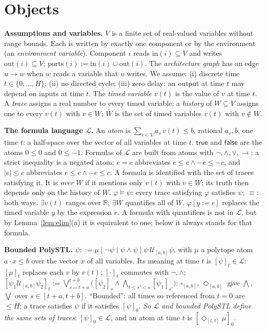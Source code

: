 \documentclass[10pt]{article}
\theoremstyle{tplain}\newtheorem{theorem}{Theorem}\newtheorem{lemma}[theorem]{Lemma}\newtheorem{proposition}[theorem]{Proposition}\newtheorem{corollary}[theorem]{Corollary}
\theoremstyle{tdef}\newtheorem{definition}[theorem]{Definition}
\newcommand{\inp}{\mathrm{in}}\newcommand{\outp}{\mathrm{out}}\newcommand{\ports}{\mathrm{ports}}
\newcommand{\TRUE}{\mathsf{true}}\newcommand{\FALSE}{\mathsf{false}}
\newcommand{\hid}[1]{\overline{#1}}
\begin{document}
\section{Objects}\label{sec:obj}
\textbf{Assumptions and variables.} $V$ is a finite set of real-valued variables without range bounds. Each is written by exactly one component or by the environment (an \emph{environment variable}). Component $i$ reads $\inp(i)\subseteq V$ and writes $\outp(i)\subseteq V$; $\ports(i):=\inp(i)\cup\outp(i)$. The \emph{architecture graph} has an edge $u\to w$ when $w$ reads a variable that $u$ writes. We assume: (i) discrete time $t\in\{0,\dots,H\}$; (ii) no directed cycle; (iii) zero delay: an output at time $t$ may depend on inputs at time $t$. The \emph{timed variable} $v(t)$ is the value of $v$ at time $t$. A \emph{trace} assigns a real number to every timed variable; a \emph{history} of $W\subseteq V$ assigns one to every $v(t)$ with $v\in W$; $\hid W$ is the set of timed variables $v(t)$ with $v\notin W$.

\textbf{The formula language $\mathcal L$.} An \emph{atom} is $\sum_{v\in V}a_v\,v(t)\le b$, rational $a_v,b$, one time $t$: a half-space over the vector of all variables at time $t$. $\TRUE$ and $\FALSE$ are the atoms $0\le0$ and $0\le-1$. Formulas of $\mathcal L$ are built from atoms with $\neg,\wedge,\vee,\to$; a strict inequality is a negated atom; $e=c$ abbreviates $e\le c\wedge -e\le -c$, and $|e|\le c$ abbreviates $e\le c\wedge -e\le c$. A formula is identified with the set of traces satisfying it. It is \emph{over} $W$ if it mentions only $v(t)$ with $v\in W$; its truth then depends only on the history of $W$. $\varphi\models\psi$: every trace satisfying $\varphi$ satisfies $\psi$; $\equiv$: both ways. $\exists v(t)$ ranges over $\mathbb R$; $\exists\hid W$ quantifies all of $\hid W$. $\varphi[y:=e]$ replaces the timed variable $y$ by the expression $e$. A formula with quantifiers is not in $\mathcal L$, but by Lemma~\ref{lem:elim}(a) it is equivalent to one; below it always stands for that formula.

\textbf{Bounded PolySTL.} $\psi::=\mu\mid\neg\psi\mid\psi\wedge\psi\mid\psi\,\mathcal U_{[a,b]}\psi$, with $\mu$ a polytope atom $a\cdot x\le b$ over the vector $x$ of all variables. Its meaning at time $t$ is $[\psi]_t\in\mathcal L$: $[\mu]_t$ replaces each $v$ by $v(t)$; $[\cdot]_t$ commutes with $\neg,\wedge$; $[\psi_1\mathcal U_{[a,b]}\psi_2]_t:=\bigvee_{s=t+a}^{t+b}\big([\psi_2]_s\wedge\bigwedge_{t\le s'<s}[\psi_1]_{s'}\big)$; $\square_{[a,b]}$, $\Diamond_{[a,b]}$ give $\bigwedge$, $\bigvee$ over $s\in[t+a,t+b]$. ``Bounded'': all times so referenced from $t=0$ are $\le H$; a trace satisfies $\psi$ if it satisfies $[\psi]_0$. \emph{So $\mathcal L$ and bounded PolySTL define the same sets of traces}: $[\psi]_0\in\mathcal L$, and an atom at time $t$ is $[\Diamond_{[t,t]}\mu]_0$.
\end{document}
